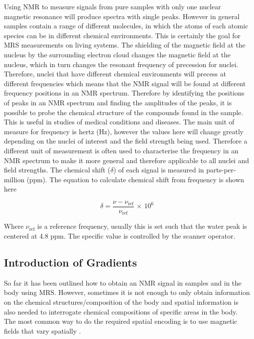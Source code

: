 Using \ac{NMR} to measure signals from pure samples with only one nuclear magnetic resonance will produce spectra with single peaks. However in general samples contain a range of different molecules, in which the atoms of each atomic species can be in different chemical environments. This is certainly the goal for \ac{MRS} measurements on living systems. The shielding of the magnetic field at the nucleus by the surrounding electron cloud changes the magnetic field at the nucleus, which in turn changes the resonant frequency of precession for nuclei. Therefore, nuclei that have different chemical environments will precess at different frequencies which means that the \ac{NMR} signal will be found at different frequency positions in an \ac{NMR} spectrum. Therefore by identifying the positions of peaks in an \ac{NMR} spectrum and finding the amplitudes of the peaks, it is possible to probe the chemical structure of the compounds found in the sample. This is useful in studies of medical conditions and diseases. The main unit of measure for frequency is hertz (Hz), however the values here will change greatly depending on the nuclei of interest and the field strength being used. Therefore a different unit of measurement is often used to characterise the frequency in an \ac{NMR} spectrum to make it more general and therefore applicable to all nuclei and field strengths. The chemical shift ($\delta$) of each signal is measured in parts-per-million (ppm). The equation to calculate chemical shift from frequency is shown here

\begin{equation}
    \delta = \frac{\nu - \nu_{\textrm{ref}}}{\nu_\textrm{ref}} \, \times \, 10^6
    \label{eqn:theory:chemshift}
\end{equation}

Where $\nu_{\textrm{ref}}$ is a reference frequency, usually this is set such that the water peak is centered at 4.8 ppm. The specific value is controlled by the scanner operator.  

\subsection{Introduction of Gradients}

So far it has been outlined how to obtain an \ac{NMR} signal in samples and in the body using MRS. However, sometimes it is not enough to only obtain information on the chemical structures/composition of the body and spatial information is also needed to interrogate chemical compositions of specific areas in the body. The most common way to do the required spatial encoding is to use magnetic fields that vary spatially \cite{Haacke2014MagneticDesign}. 

